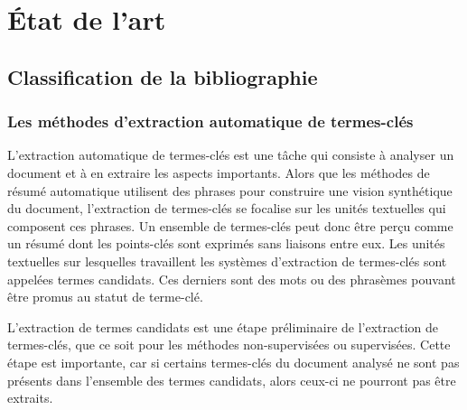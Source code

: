 \chapter{État de l'art}
  \section{Classification de la bibliographie}
  \subsection{Les méthodes d'extraction automatique de termes-clés}
  \label{sec:methods}
    L'extraction automatique de termes-clés est une tâche qui consiste à analyser
    un document et à en extraire les aspects importants. Alors que les méthodes de
    résumé automatique utilisent des phrases pour construire une vision
    synthétique du document, l'extraction de termes-clés se focalise sur les
    unités textuelles qui composent ces phrases. Un ensemble de termes-clés peut
    donc être perçu comme un résumé dont les points-clés sont exprimés sans
    liaisons entre eux. Les unités textuelles sur lesquelles travaillent les
    systèmes d'extraction de termes-clés sont appelées termes candidats. Ces
    derniers sont des mots ou des phrasèmes pouvant être promus au statut de
    terme-clé.

    L'extraction de termes candidats est une étape préliminaire de l'extraction de
    termes-clés, que ce soit pour les méthodes non-supervisées ou supervisées.
    Cette étape est importante, car si certains termes-clés du document analysé ne
    sont pas présents dans l'ensemble des termes candidats, alors ceux-ci ne
    pourront pas être extraits.

